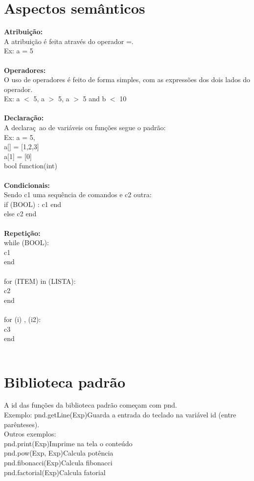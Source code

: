 \documentclass[letterpaper,12pt]{article}
\begin{document}
\section{Aspectos sem\^anticos}
\textbf{Atribui\c{c}\~ao:}\\
A atribui\c{c}\~ao \'e feita atrav\'es do operador =.\\
Ex: a = 5\\
\\
\textbf{Operadores:}\\
O uso de operadores \'e feito de forma simples, com as express\~oes dos dois lados do operador.\\
Ex: a $<$ 5, a $>$ 5, a $>$ 5 and b $<$ 10\\
\\
\textbf{Declara\c{c}\~ao:}\\
A declara\c{c}~ao de vari\'aveis ou fun\c{c}\~oes segue o padr\~ao:\\
Ex: a = 5,\\
a[] = [1,2,3]\\
a[1] = [0]\\
bool function(int)\\
\\
\textbf{Condicionais:}\\
Sendo c1 uma sequ\^encia de comandos e c2 outra:\\
if (BOOL) : c1 end\\
else c2 end\\
\\
\textbf{Repeti\c{c}\~ao:}\\
while (BOOL):\\
    c1\\
end\\
\\
for (ITEM) in (LISTA):\\
    c2\\
end\\
\\
for (i) , (i2):\\
    c3\\
end\\
\\
\section{Biblioteca padr\~ao}
A id das fun\c{c}\~oes da biblioteca padr\~ao come\c{c}am com pnd.\\
Exemplo: pnd.getLine(Exp)\hspace*{8mm}Guarda a entrada do teclado na vari\'avel id (entre par\^enteses).\\
Outros exemplos:\\
pnd.print(Exp)\hspace*{24mm}Imprime na tela o conte\'udo\\
pnd.pow(Exp, Exp)\hspace*{24mm}Calcula pot\^encia\\
pnd.fibonacci(Exp)\hspace*{24mm}Calcula fibonacci\\
pnd.factorial(Exp)\hspace*{24mm}Calcula fatorial\\
\\
\end{document}
